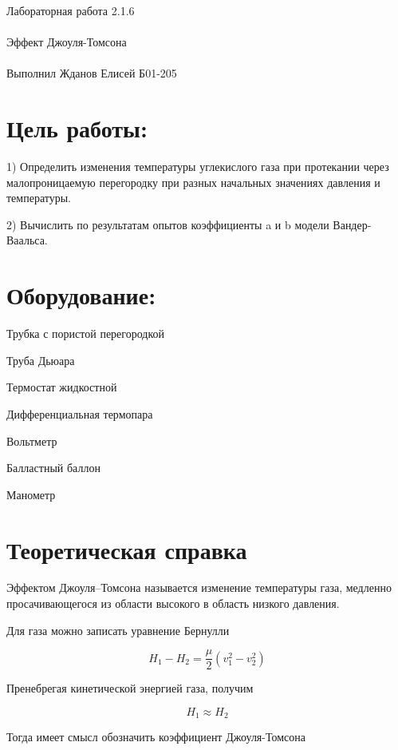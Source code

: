 \documentclass{astroedu-lab}
\begin{document}
\pagestyle{plain}

\begin{problem}{\huge Лабораторная работа 2.1.6\\\\Эффект Джоуля-Томсона\\\\Выполнил Жданов Елисей Б01-205}

\section{Цель работы:}

1) Определить изменения температуры углекислого газа при протекании через малопроницаемую перегородку при разных начальных значениях давления
и температуры. 

2) Вычислить по результатам опытов коэффициенты a и b модели Вандер-Ваальса.


\section{Оборудование:}

Трубка с пористой перегородкой

Труба Дьюара

Термостат жидкостной

Дифференциальная термопара

Вольтметр

Балластный баллон

Манометр

\section{Теоретическая справка}

Эффектом Джоуля–Томсона называется изменение температуры газа, медленно
просачивающегося из области высокого в область низкого давления.

Для газа можно записать уравнение Бернулли

\begin{equation}
	H_1 - H_2 = \frac{\mu}{2} \left( v_1^2 - v_2^2 \right)
\end{equation}

Пренебрегая кинетической энергией газа, получим

\begin{equation}
	H_1 \approx H_2
\end{equation}

Тогда имеет смысл обозначить коэффициент Джоуля-Томсона


\end{problem}
\end{document}
